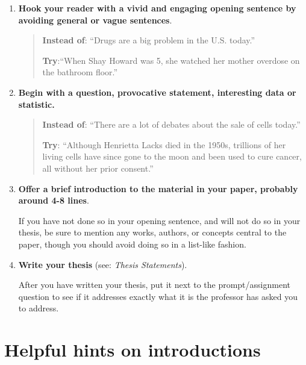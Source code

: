 \begin{enumerate}
\item \textbf{Hook your reader with a vivid and engaging opening sentence by avoiding general or vague sentences}.
        	               	        	
\begin{quote}

\textbf{Instead of}: ``Drugs are a big problem in the U.S. today.''

\textbf{Try}:``When Shay Howard was 5, she watched her mother
overdose on  the bathroom floor.''
\end{quote}
        	    	
\item {\textbf{Begin with a question, provocative statement, interesting data or statistic.}}

\begin{quote}
                            	                   
\textbf{Instead of}: ``There are a lot of debates about the sale of cells today.''

\textbf{Try}: ``Although Henrietta Lacks died in the 1950s, trillions
      of her living cells have since gone to the moon and  
      been used to cure cancer, all without her prior
      consent.''     
\end{quote}
                    	 
\item \textbf{Offer a brief introduction to the material in your paper, probably around 4-8 lines}. 

If you have not done so in your opening sentence, and will not do so in your thesis, be sure to mention any works, authors, or concepts central to the paper, though you should avoid doing so in a list-like fashion.
 
\item \textbf{Write your thesis} (see: \emph{Thesis Statements}).

After you have written your thesis, put it next to the prompt/assignment question to see if it addresses exactly what it is the professor has asked you to address.  
  
 \end{enumerate}

 
\section{Helpful hints on introductions}

